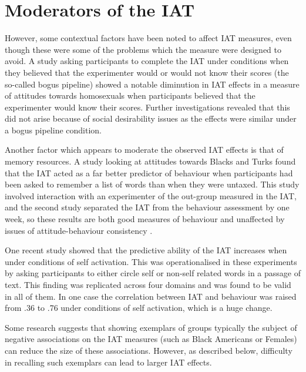\section{Moderators of the IAT}


However, some contextual factors have been noted to affect IAT measures, even though these were some of the problems which the measure were designed to avoid. A study asking participants to complete the IAT under conditions when they believed that the experimenter would or would not know their scores (the so-called bogus pipeline) \cite{Boysen2006} showed a notable diminution in IAT effects in a measure of attitudes towards homosexuals when participants believed that the experimenter would know their scores. Further investigations revealed that this did not arise because of social desirability issues as the effects were similar under a bogus pipeline condition. 

Another factor which appears to moderate the observed IAT effects is that of memory resources. A study looking at attitudes towards Blacks and Turks \cite{Hofmann2008a} found that the IAT acted as a far better predictor of behaviour when participants had been asked to remember a list of words than when they were untaxed. This study involved interaction with an experimenter of the out-group measured in the IAT, and the second study separated the IAT from the behaviour assessment by one week, so these results are both good measures of behaviour and unaffected by  issues of attitude-behaviour consistency . 

One recent study \cite{Perugini2007} showed that the predictive ability of the IAT increases when under conditions of self activation. This was operationalised in these experiments by asking participants to either circle self or non-self related words in a passage of text. This finding was replicated across four domains and was found to be valid in all of them. In one case the correlation between IAT and behaviour was raised from .36 to .76 under conditions of self activation, which is a huge change. 

Some research \cite{Dasgupta2001} suggests that showing exemplars of groups typically the subject of negative associations on the IAT measures (such as Black Americans or Females) can reduce the size of these associations. However, as described below, difficulty in recalling such exemplars can lead to larger IAT effects. 


